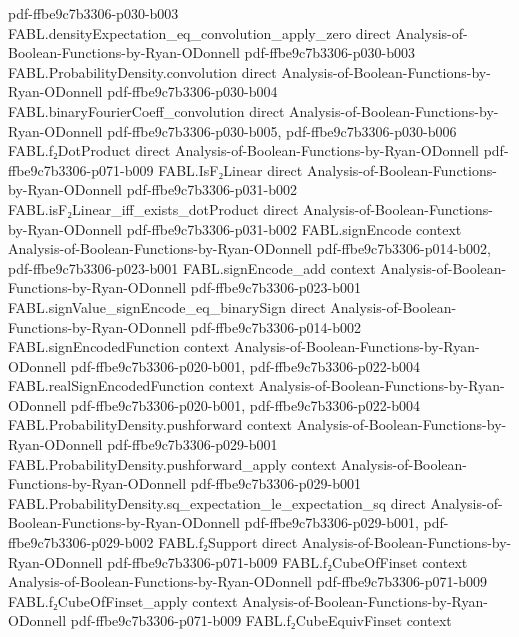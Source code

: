 \begin{theorem}
  {pdf-ffbe9c7b3306-p030-b003}
\proofstep
  {FABL.densityExpectation_eq_convolution_apply_zero}
  {direct}
  {Analysis-of-Boolean-Functions-by-Ryan-ODonnell}
  {pdf-ffbe9c7b3306-p030-b003}
\proofstep
  {FABL.ProbabilityDensity.convolution}
  {direct}
  {Analysis-of-Boolean-Functions-by-Ryan-ODonnell}
  {pdf-ffbe9c7b3306-p030-b004}
\proofstep
  {FABL.binaryFourierCoeff_convolution}
  {direct}
  {Analysis-of-Boolean-Functions-by-Ryan-ODonnell}
  {pdf-ffbe9c7b3306-p030-b005,
    pdf-ffbe9c7b3306-p030-b006}
\proofstep
  {FABL.f₂DotProduct}
  {direct}
  {Analysis-of-Boolean-Functions-by-Ryan-ODonnell}
  {pdf-ffbe9c7b3306-p071-b009}
\proofstep
  {FABL.IsF₂Linear}
  {direct}
  {Analysis-of-Boolean-Functions-by-Ryan-ODonnell}
  {pdf-ffbe9c7b3306-p031-b002}
\proofstep
  {FABL.isF₂Linear_iff_exists_dotProduct}
  {direct}
  {Analysis-of-Boolean-Functions-by-Ryan-ODonnell}
  {pdf-ffbe9c7b3306-p031-b002}
\proofstep
  {FABL.signEncode}
  {context}
  {Analysis-of-Boolean-Functions-by-Ryan-ODonnell}
  {pdf-ffbe9c7b3306-p014-b002,
    pdf-ffbe9c7b3306-p023-b001}
\proofstep
  {FABL.signEncode_add}
  {context}
  {Analysis-of-Boolean-Functions-by-Ryan-ODonnell}
  {pdf-ffbe9c7b3306-p023-b001}
\proofstep
  {FABL.signValue_signEncode_eq_binarySign}
  {direct}
  {Analysis-of-Boolean-Functions-by-Ryan-ODonnell}
  {pdf-ffbe9c7b3306-p014-b002}
\proofstep
  {FABL.signEncodedFunction}
  {context}
  {Analysis-of-Boolean-Functions-by-Ryan-ODonnell}
  {pdf-ffbe9c7b3306-p020-b001,
    pdf-ffbe9c7b3306-p022-b004}
\proofstep
  {FABL.realSignEncodedFunction}
  {context}
  {Analysis-of-Boolean-Functions-by-Ryan-ODonnell}
  {pdf-ffbe9c7b3306-p020-b001,
    pdf-ffbe9c7b3306-p022-b004}
\proofstep
  {FABL.ProbabilityDensity.pushforward}
  {context}
  {Analysis-of-Boolean-Functions-by-Ryan-ODonnell}
  {pdf-ffbe9c7b3306-p029-b001}
\proofstep
  {FABL.ProbabilityDensity.pushforward_apply}
  {context}
  {Analysis-of-Boolean-Functions-by-Ryan-ODonnell}
  {pdf-ffbe9c7b3306-p029-b001}
\proofstep
  {FABL.ProbabilityDensity.sq_expectation_le_expectation_sq}
  {direct}
  {Analysis-of-Boolean-Functions-by-Ryan-ODonnell}
  {pdf-ffbe9c7b3306-p029-b001,
    pdf-ffbe9c7b3306-p029-b002}
\proofstep
  {FABL.f₂Support}
  {direct}
  {Analysis-of-Boolean-Functions-by-Ryan-ODonnell}
  {pdf-ffbe9c7b3306-p071-b009}
\proofstep
  {FABL.f₂CubeOfFinset}
  {context}
  {Analysis-of-Boolean-Functions-by-Ryan-ODonnell}
  {pdf-ffbe9c7b3306-p071-b009}
\proofstep
  {FABL.f₂CubeOfFinset_apply}
  {context}
  {Analysis-of-Boolean-Functions-by-Ryan-ODonnell}
  {pdf-ffbe9c7b3306-p071-b009}
\proofstep
  {FABL.f₂CubeEquivFinset}
  {context}

\end{theorem}
